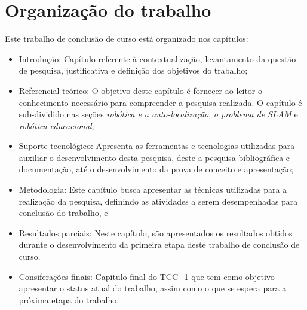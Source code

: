 	\section{Organização do trabalho} %
	\label{sec:organização_do_trabalho}
		Este trabalho de conclusão de curso está organizado nos capítulos:
		\begin{itemize}
			\item Introdução: Capítulo referente à contextualização, levantamento da questão de pesquisa, justificativa e definição dos objetivos do trabalho;

			\item Referencial teórico: O objetivo deste capítulo é fornecer ao leitor o conhecimento necessário para compreender a pesquisa realizada. O capítulo é sub-dividido nas seções \textit{robótica e a auto-localização},  \textit{o problema de SLAM} e \textit{robótica educacional};

			\item Suporte tecnológico: Apresenta as ferramentas e tecnologias utilizadas para auxiliar o desenvolvimento desta pesquisa, deste a pesquisa bibliográfica e documentação, até o desenvolvimento da prova de conceito e apresentação;

			\item Metodologia: Este capítulo busca apresentar as técnicas utilizadas para a realização da pesquisa, definindo as atividades a serem desempenhadas para conclusão do trabalho, e

			\item Resultados parciais: Neste capítulo, são apresentados os resultados obtidos durante o desenvolvimento da primeira etapa deste trabalho de conclusão de curso.

			\item Consiferações finais: Capítulo final do TCC\_1 que tem como objetivo apresentar o status atual do trabalho, assim como o que se espera para a próxima etapa do trabalho.
		\end{itemize}

